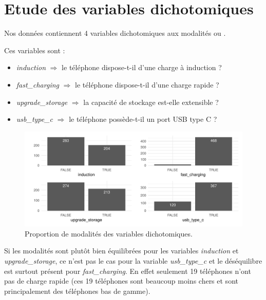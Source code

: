 \documentclass[
  12pt,
]{report}
\providecommand{\tightlist}{%
  \setlength{\itemsep}{0pt}\setlength{\parskip}{0pt}}\usepackage{longtable,booktabs,array}
\renewcommand{\texttt}[1]{\colorbox{light}{\color{highlight}{\ttfamily{#1}}}}
\begin{document}
\newpage

\section{Etude des variables
dichotomiques}\label{etude-des-variables-dichotomiques}

Nos données contiennent 4 variables dichotomiques aux modalités
\texttt{TRUE} ou \texttt{FALSE}.

Ces variables sont :

\begin{itemize}
\tightlist
\item
  \emph{induction} \(\Rightarrow\) le téléphone dispose-t-il d'une
  charge à induction ?
\item
  \emph{fast\_charging} \(\Rightarrow\) le téléphone dispose-t-il d'une
  charge rapide ?
\item
  \emph{upgrade\_storage} \(\Rightarrow\) la capacité de stockage
  est-elle extensible ?
\item
  \emph{usb\_type\_c} \(\Rightarrow\) le téléphone possède-t-il un port
  USB type C ?
\end{itemize}

\begin{figure}[H]

{\centering \includegraphics{report_files/figure-pdf/binary_vars-1.pdf}

}

\caption{Proportion de modalités des variables dichotomiques.}

\end{figure}%

Si les modalités sont plutôt bien équilibrées pour les variables
\emph{induction} et \emph{upgrade\_storage}, ce n'est pas le cas pour la
variable \emph{usb\_type\_c} et le déséquilibre est surtout présent pour
\emph{fast\_charging}. En effet seulement 19 téléphones n'ont pas de
charge rapide (ces 19 téléphones sont beaucoup moins chers et sont
principalement des téléphones bas de gamme).
\end{document}
